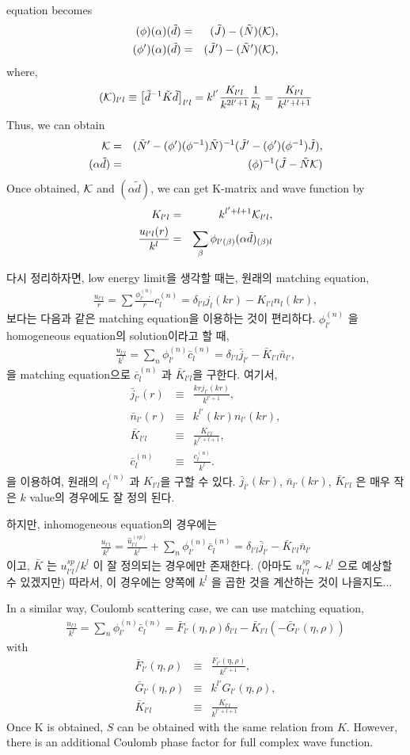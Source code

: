 \documentclass[10pt]{book}
\newcommand{\bea}{\begin{eqnarray}}
\newcommand{\eea}{\end{eqnarray}}
\newcommand{\no}{\nonumber \\}
\begin{document}
equation becomes
\bea
(\phi)(\alpha)(\tilde{d})&=&(\tilde{J})-(\tilde{N})({\cal K})
,\no
(\phi')(\alpha)(\tilde{d})&=&(\tilde{J}')-(\tilde{N}')({\cal K}),\no
\eea
where,
\bea
({\cal K})_{l'l}\equiv
\left[\tilde{d}^{-1}\tilde{K}\tilde{d}\right]_{l'l}
=k^{l'}\frac{K_{l'l}}{k^{2l'+1}}\frac{1}{k_{l}}
=\frac{K_{l'l}}{k^{l'+l+1}}
\eea
Thus, we can obtain
\bea
{\cal K}&=&(\tilde{N}'-(\phi')(\phi^{-1})\tilde{N})^{-1}
           (\tilde{J}'-(\phi')(\phi^{-1})\tilde{J}),\no
({\alpha}\tilde{d})&=&(\phi)^{-1}(\tilde{J}-\tilde{N}{\cal K})              
\eea
Once obtained, ${\cal K}$ and $(\alpha\tilde{d})$,
we can get K-matrix and wave function by
\bea
K_{l'l}&=&k^{l'+l+1}{\cal K}_{l'l},\no
\frac{u_{l'l}(r)}{k^l}&=&
    \sum_{\beta} \phi_{l'(\beta)}(\alpha\tilde{d})_{(\beta)l}
\eea

다시 정리하자면, low energy limit을 생각할 때는, 원래의 matching equation,
\bea 
\frac{u_{l'l}}{r}=\sum \frac{\phi_{l'}^{(n)}}{r} c^{(n)}_l
                 =\delta_{l'l} j_l(kr)-K_{l'l} n_l(kr),
\eea 
 보다는 
다음과 같은 matching equation을 이용하는 것이 편리하다.
$\phi_{l'}^{(n)}$ 을 homogeneous equation의 solution이라고 할 때,
\bea 
\frac{u_{l'l}}{k^l}=\sum_{n} \phi_{l'}^{(n)} \bar{c}^{(n)}_l
                   =\delta_{l'l} \bar{j}_{l'}-\bar{K}_{l'l} \bar{n}_{l'},
\eea 
을 matching equation으로 $\bar{c}_{l}^{(n)}$ 과 $\bar{K}_{l'l}$을 구한다.
여기서,
\bea 
\bar{j}_{l'}(r)&\equiv& \frac{k r j_{l'}(kr)}{k^{l'+1}},\no 
\bar{n}_{l'}(r)&\equiv&  k^{l'} (kr) n_{l'}(kr),\no 
\bar{K}_{l' l}&\equiv& \frac{K_{l'l}}{k^{l'+l+1}},\no 
\bar{c}_{l}^{(n)}&\equiv& \frac{c^{(n)}_{l}}{k^l}.
\eea 
을 이용하여, 원래의 $c_l^{(n)}$ 과 $K_{l'l}$을 구할 수 있다. 
$\bar{j}_{l'}(kr)$, $\bar{n}_{l'}(kr)$, $\bar{K}_{l'l}$ 은 매우 작은 $k$ value의
경우에도 잘 정의 된다.  

하지만, inhomogeneous equation의 경우에는 
\bea 
\frac{u_{l'l}}{k^l}=\frac{\hat{u}^{(sp)}_{l' l}}{k^l}
                   +\sum_{n} \phi_{l'}^{(n)}\bar{c}_{l}^{(n)}
                   =\delta_{l'l}\bar{j}_{l'}-\bar{K}_{l'l}\bar{n}_{l'}  
\eea 
이고, $\bar{K}$ 는 $u^{sp}_{l'l}/k^l$ 이 잘 정의되는 경우에만 존재한다. 
(아마도  $u^{sp}_{l'l}\sim k^l$ 으로 예상할 수 있겠지만) 따라서,
이 경우에는 양쪽에 $k^l$ 을 곱한 것을 계산하는 것이 나을지도...

In a similar way, Coulomb scattering case, we can use matching equation,
\bea 
\frac{u_{l'l}}{k^{l}}=\sum_{n}\phi^{(n)}_{l'}\bar{c}^{(n)}_l
                     =\bar{F}_{l'}(\eta,\rho)\delta_{l'l}
                     -\bar{K}_{l'l}(-\bar{G}_{l'}(\eta,\rho) )   
\eea 
with
\bea 
\bar{F}_{l'}(\eta,\rho)&\equiv& \frac{F_{l'}(\eta,\rho)}{k^{l'+1}},\no 
\bar{G}_{l'}(\eta,\rho)&\equiv& k^{l'} G_{l'}(\eta,\rho),\no 
\bar{K}_{l'l}&\equiv&\frac{K_{l'l}}{k^{l'+l+1}} 
\eea 
Once K is obtained, $S$ can be obtained with the same relation from $K$.
However, there is an additional Coulomb phase factor for full complex wave function.
\end{document}
